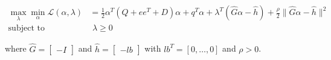 \begin{equation} \label{eq:l2_svr_lb_aug_lagrangian_dual}
	\begin{aligned}
    	\max_{\lambda} \min_{\alpha} \mathcal{L}(\alpha,\lambda) &= \frac{1}{2} \alpha^T (Q + ee^T + D) \alpha + q^T \alpha + \lambda^T (\hat{G} \alpha - \hat{h}) + \frac{\rho}{2} \| \hat{G} \alpha - \hat{h} \|^2 \\
    \text{subject to} \quad & \,\, \lambda \geq 0
	\end{aligned}
\end{equation}

where $\hat{G} =
\begin{bmatrix}
-I
\end{bmatrix}$ and $\hat{h} =
\begin{bmatrix}
-lb
\end{bmatrix}$ with $lb^T = [0, \dots, 0]$ and $\rho > 0$.